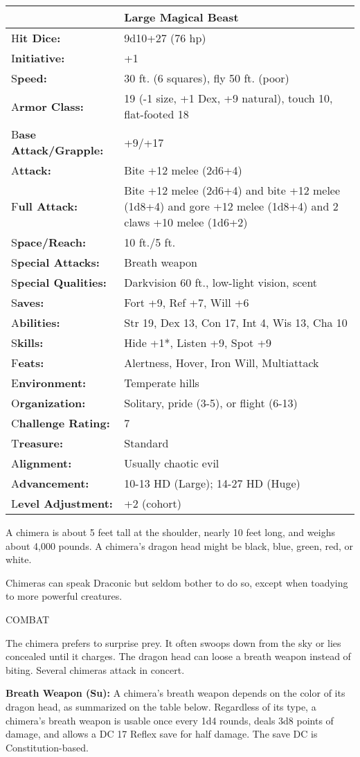 \documentclass{article}
\begin{document}
\begin{tabular}{|>{\raggedright}p{91pt}|>{\raggedright}p{231pt}|}
\hline
  & Large Magical Beast\tabularnewline
\hline
H\textbf{it Dice:} & 9d10+27 (76 hp)\tabularnewline
\hline
I\textbf{nitiative:} & +1\tabularnewline
\hline
S\textbf{peed:} & 30 ft. (6 squares), fly 50 ft. (poor)\tabularnewline
\hline
A\textbf{rmor Class:} & 19 (-1 size, +1 Dex, +9 natural), touch 10, flat-footed 
18\tabularnewline
\hline
B\textbf{ase Attack/Grapple:} & +9/+17\tabularnewline
\hline
A\textbf{ttack:} & Bite +12 melee (2d6+4)\tabularnewline
\hline
F\textbf{ull Attack:} & Bite +12 melee (2d6+4) and bite +12 melee (1d8+4) and gore 
+12 melee (1d8+4) and 2 claws +10 melee (1d6+2)\tabularnewline
\hline
S\textbf{pace/Reach:} & 10 ft./5 ft.\tabularnewline
\hline
S\textbf{pecial Attacks:} & Breath weapon\tabularnewline
\hline
S\textbf{pecial Qualities:} & Darkvision 60 ft., low-light vision, scent\tabularnewline
\hline
S\textbf{aves:} & Fort +9, Ref +7, Will +6\tabularnewline
\hline
A\textbf{bilities:} & Str 19, Dex 13, Con 17, Int 4, Wis 13, Cha 10\tabularnewline
\hline
S\textbf{kills:} & Hide +1*, Listen +9, Spot +9\tabularnewline
\hline
F\textbf{eats:} & Alertness, Hover, Iron Will, Multiattack\tabularnewline
\hline
E\textbf{nvironment:} & Temperate hills\tabularnewline
\hline
O\textbf{rganization:} & Solitary, pride (3-5), or flight (6-13)\tabularnewline
\hline
C\textbf{hallenge Rating:} & 7\tabularnewline
\hline
T\textbf{reasure:} & Standard\tabularnewline
\hline
A\textbf{lignment:} & Usually chaotic evil\tabularnewline
\hline
A\textbf{dvancement:} & 10-13 HD (Large); 14-27 HD (Huge)\tabularnewline
\hline
L\textbf{evel Adjustment:} & +2 (cohort)\tabularnewline
\hline
\end{tabular}

A chimera is about 5 feet tall at the shoulder, nearly 10 feet long, and weighs 
about 4,000 pounds. A chimera's dragon head might be black, blue, green, red, or 
white.

Chimeras can speak Draconic but seldom bother to do so, except when toadying to 
more powerful creatures.

COMBAT

The chimera prefers to surprise prey. It often swoops down from the sky or lies 
concealed until it charges. The dragon head can loose a breath weapon instead of 
biting. Several chimeras attack in concert.

\textbf{Breath Weapon (Su):} A chimera's breath weapon depends on the color of 
its dragon head, as summarized on the table below. Regardless of its type, a chimera's 
breath weapon is usable once every 1d4 rounds, deals 3d8 points of damage, and 
allows a DC 17 Reflex save for half damage. The save DC is Constitution-based.
\end{document}
